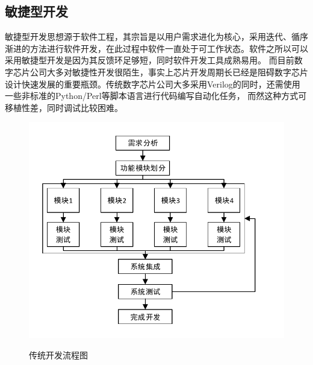     \subsection{敏捷型开发}
    敏捷型开发思想源于软件工程，其宗旨是以用户需求进化为核心，采用迭代、循序渐进的方法进行软件开发，在此过程中软件一直处于可工作状态。软件之所以可以采用敏捷型开发是因为其反馈环足够短，同时软件开发工具成熟易用。
    而目前数字芯片公司大多对敏捷性开发很陌生，事实上芯片开发周期长已经是阻碍数字芯片设计快速发展的重要瓶颈。传统数字芯片公司大多采用Verilog的同时，还需使用一些非标准的Python/Perl等脚本语言进行代码编写自动化任务，
    而然这种方式可移植性差，同时调试比较困难。
    \begin{figure}[h]
        \centering
        \includegraphics{../pdf/tradition.pdf}\\
        \caption{传统开发流程图}
        \label{tra}
    \end{figure}
